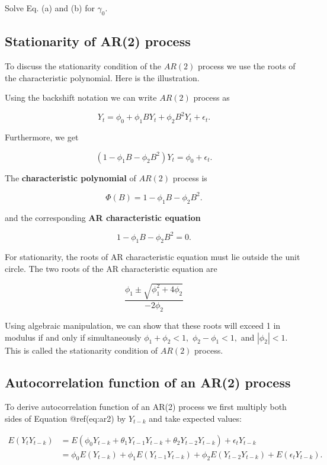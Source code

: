 \documentclass[
  11pt,
  a4paper,
]{report}
\begin{document}
Solve Eq. (a) and (b) for \(\gamma_0.\)

\subsection{Stationarity of AR(2)
process}\label{stationarity-of-ar2-process}

To discuss the stationarity condition of the \(AR(2)\) process we use
the roots of the characteristic polynomial. Here is the illustration.

Using the backshift notation we can write \(AR(2)\) process as

\[Y_t = \phi_0 + \phi_1 BY_{t} + \phi_2 B^2 Y_{t} + \epsilon_t.\]

Furthermore, we get

\[(1-\phi_1 B - \phi_2 B^2) Y_t = \phi_0 + \epsilon_t.\]

The \textbf{characteristic polynomial} of \(AR(2)\) process is

\[\Phi(B)=1-\phi_1 B - \phi_2 B^2.\]

and the corresponding \textbf{AR characteristic equation}

\[1-\phi_1 B - \phi_2 B^2=0.\]

For stationarity, the roots of AR characteristic equation must lie
outside the unit circle. The two roots of the AR characteristic equation
are

\[\frac{\phi_1 \pm \sqrt{\phi_1^2 + 4\phi_2}}{-2\phi_2}\]

Using algebraic manipulation, we can show that these roots will exceed 1
in modulus if and only if simultaneously \(\phi_1 + \phi_2 < 1,\)
\(\phi_2-\phi_1 < 1,\) and \(|\phi_2| < 1.\) This is called the
stationarity condition of \(AR(2)\) process.

\subsection{Autocorrelation function of an AR(2)
process}\label{autocorrelation-function-of-an-ar2-process}

To derive autocorrelation function of an AR(2) process we first multiply
both sides of Equation @ref(eq:ar2) by \(Y_{t-k}\) and take expected
values:

\begin{align}
E(Y_tY_{t-k}) &= E(\phi_0Y_{t-k}+\theta_1Y_{t-1}Y_{t-k}+\theta_2Y_{t-2}Y_{t-k})+\epsilon_tY_{t-k} \\
&= \phi_0 E(Y_{t-k})+\phi_{1}E(Y_{t-1}Y_{t-k}) + \phi_2 E(Y_{t-2} Y_{t-k}) + E(\epsilon_tY_{t-k}).
\end{align}
\end{document}
